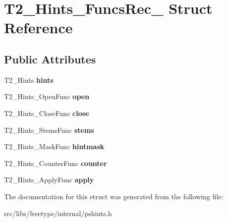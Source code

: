 \hypertarget{struct_t2___hints___funcs_rec__}{
\section{T2\_\-Hints\_\-FuncsRec\_\- Struct Reference}
\label{struct_t2___hints___funcs_rec__}
}
\subsection*{Public Attributes}
\begin{DoxyCompactItemize}
\item 
\hypertarget{struct_t2___hints___funcs_rec___af8daab694889bede5a513fbae5f86e25}{
T2\_\-Hints {\bfseries hints}}
\label{struct_t2___hints___funcs_rec___af8daab694889bede5a513fbae5f86e25}

\item 
\hypertarget{struct_t2___hints___funcs_rec___a1a5e0b296ee2e2ae6711b3ee35e5fcd9}{
T2\_\-Hints\_\-OpenFunc {\bfseries open}}
\label{struct_t2___hints___funcs_rec___a1a5e0b296ee2e2ae6711b3ee35e5fcd9}

\item 
\hypertarget{struct_t2___hints___funcs_rec___a7e50e26fd55254044bc9f2ba62574352}{
T2\_\-Hints\_\-CloseFunc {\bfseries close}}
\label{struct_t2___hints___funcs_rec___a7e50e26fd55254044bc9f2ba62574352}

\item 
\hypertarget{struct_t2___hints___funcs_rec___a12bfd8bae5d3df8f570fcdfb70c00139}{
T2\_\-Hints\_\-StemsFunc {\bfseries stems}}
\label{struct_t2___hints___funcs_rec___a12bfd8bae5d3df8f570fcdfb70c00139}

\item 
\hypertarget{struct_t2___hints___funcs_rec___af50d0cadda7033d7dbd27a199ccfcdd4}{
T2\_\-Hints\_\-MaskFunc {\bfseries hintmask}}
\label{struct_t2___hints___funcs_rec___af50d0cadda7033d7dbd27a199ccfcdd4}

\item 
\hypertarget{struct_t2___hints___funcs_rec___ad9d856a64b4a8556fc8d74bae1779e11}{
T2\_\-Hints\_\-CounterFunc {\bfseries counter}}
\label{struct_t2___hints___funcs_rec___ad9d856a64b4a8556fc8d74bae1779e11}

\item 
\hypertarget{struct_t2___hints___funcs_rec___abaf12efb416bd79cf4ce72b13e6fc68f}{
T2\_\-Hints\_\-ApplyFunc {\bfseries apply}}
\label{struct_t2___hints___funcs_rec___abaf12efb416bd79cf4ce72b13e6fc68f}

\end{DoxyCompactItemize}


The documentation for this struct was generated from the following file:\begin{DoxyCompactItemize}
\item 
src/libs/freetype/internal/pshints.h\end{DoxyCompactItemize}
